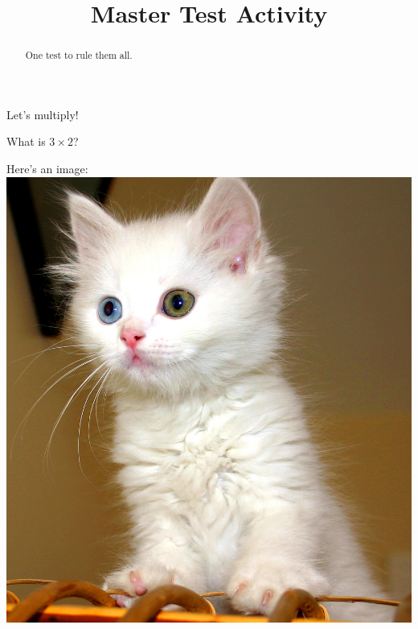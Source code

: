 \documentclass{ximera}
\title{Master Test Activity}
\begin{document}
\begin{abstract}
  One test to rule them all.
\end{abstract}

Let's multiply!
\begin{question}
	What is $3 \times 2$?  
\end{question}

Here's an image:
\includegraphics[scale=.1]{testCat.jpg}
\end{document}
